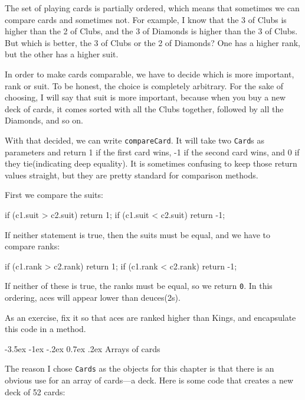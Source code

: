\documentclass{book}
\makeatletter
\renewcommand{\section}{\@startsection 
    {section} {1} {0mm}%
    {-3.5ex \@plus -1ex \@minus -.2ex}%
    {0.7ex \@plus.2ex}%
    {\normalfont\Large\bfseries}}
\makeatother
\begin{document}
The set of playing cards is partially ordered, which means that
sometimes we can compare cards and sometimes not.  For example, I know
that the 3 of Clubs is higher than the 2 of Clubs, and the 3 of
Diamonds is higher than the 3 of Clubs.  But which is better, the 3 of
Clubs or the 2 of Diamonds?  One has a higher rank, but the other has
a higher suit.


In order to make cards comparable, we have to decide which is more
important, rank or suit.  To be honest, the choice is completely
arbitrary.  For the sake of choosing, I will say that suit is more
important, because when you buy a new deck of cards, it comes sorted
with all the Clubs together, followed by all the Diamonds, and so on.

With that decided, we can write {\tt compareCard}.  It
will take two {\tt Card}s as parameters and return 1 if
the first card wins, -1 if the second card wins, and 0 if
they tie(indicating deep equality).  It is sometimes confusing
to keep those return values straight, but they are pretty
standard for comparison methods.

First we compare the suits:

\begin{verbatimtab}
    if (c1.suit > c2.suit) return 1;
    if (c1.suit < c2.suit) return -1;
\end{verbatimtab}
%
If neither statement is true, then the suits must be equal,
and we have to compare ranks:

\begin{verbatimtab}
    if (c1.rank > c2.rank) return 1;
    if (c1.rank < c2.rank) return -1;
\end{verbatimtab}
%
If neither of these is true, the ranks must be equal,
so we return {\tt 0}.  In this ordering, aces will appear
lower than deuces(2s).

As an exercise, fix it so that aces are ranked higher than Kings, and
encapsulate this code in a method.


\section{Arrays of cards}
\label{cardarray}

The reason I chose {\tt Cards} as the objects for this chapter is that
there is an obvious use for an array of cards---a deck.  Here is some
code that creates a new deck of 52 cards:
\end{document}
